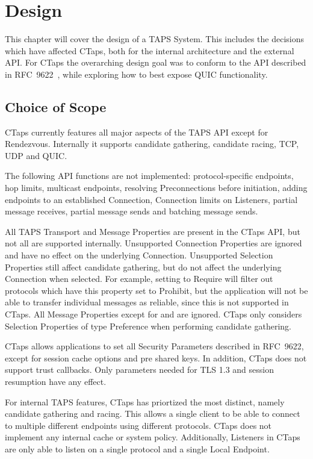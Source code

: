 \chapter{Design} \label{chap:design}
This chapter will cover the design of a TAPS System. 
This includes the decisions which have affected
CTaps, both for the internal architecture and the external API.
For CTaps the overarching design goal was to conform to the API described in RFC~9622~\cite{rfc9622},
while exploring how to best expose QUIC functionality.

\section{Choice of Scope}\label{sec:design-scope}
CTaps currently features all major aspects of the TAPS API except for Rendezvous.
Internally it supports  candidate gathering,
candidate racing, TCP, UDP and QUIC.

The following API functions are not implemented:
protocol-specific endpoints, hop limits, multicast endpoints,
resolving Preconnections before initiation,
adding endpoints to an established Connection, 
Connection limits on Listeners,
partial message receives, partial message sends and batching message sends.

All TAPS Transport and Message Properties are present in the CTaps API,
but not all are supported internally.
Unsupported Connection Properties are ignored and have
no effect on the underlying Connection.
Unsupported Selection
Properties still affect candidate gathering, but do not
affect the underlying Connection when selected.
For example, setting  to Require will filter
out protocols which have this property set to Prohibit, but the application
will not be able to transfer individual messages as reliable, since this
is not supported in CTaps. 
All Message Properties except for  and  are ignored.
CTaps only considers Selection Properties of type Preference when
performing candidate gathering.

CTaps allows applications to set all Security Parameters described in RFC~9622,
except for session cache options and pre shared keys.
In addition, CTaps does not support trust callbacks. Only parameters
needed for TLS 1.3 and session resumption have any effect.

For internal TAPS features, CTaps has priortized the most distinct,
namely candidate gathering and racing. This allows a single
client to be able to connect to multiple different endpoints using different
protocols. CTaps does not implement any internal cache or system policy. Additionally,
Listeners in CTaps are only able to listen on a single protocol and a single Local
Endpoint.


